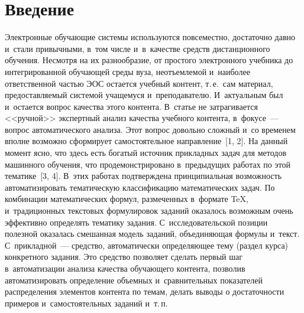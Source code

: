 
  
\vspace*{-6pt}



\thispagestyle{headings}

\begin{multicols}{2}

\label{st\stat}

\section{Введение}

\vspace*{-3pt}

     Электронные обучающие системы используются повсеместно, 
достаточно давно и~стали привычными, в~том числе и~в~качестве средств 
дистанционного обучения. Несмотря на их разнообразие, от простого 
электронного учебника до интегрированной обучающей среды вуза, 
неотъемлемой и~наиболее ответственной частью ЭОС остается учебный 
контент, т.\,е.\ сам материал, предоставляемый системой учащемуся и~преподавателю. И~актуальным был и~остается вопрос качества этого 
контента. В~статье не затрагивается <<ручной>> экспертный анализ качества 
учебного контента, в~фокусе~--- вопрос автоматического анализа. Этот 
вопрос довольно сложный и~со временем вполне возможно сформирует 
самостоятельное направление~[1, 2]. На данный момент ясно, что здесь есть 
богатый источник прикладных задач для методов машинного обучения, что 
продемонстрировано в~предыдущих работах по этой тематике~[3, 4]. В~этих 
работах подтверждена принципиальная возможность автоматизировать 
тематическую классификацию математических задач. По комбинации 
математических формул, размеченных в~формате \TeX, и~традиционных 
текстовых формулировок заданий оказалось возможным очень эффективно 
определять тематику задания. С~исследовательской позиции полезной 
оказалась смешанная модель заданий, объединяющая формулы и~текст. 
С~прикладной~--- средство, автоматически определяющее тему (раздел 
курса) конкретного задания. Это средство позволяет сделать первый шаг 
в~автоматизации анализа качества обучающего контента, позволив 
автоматизировать определение объемных и~сравнительных показателей 
распределения элементов контента по темам, делать выводы о достаточности 
примеров и~самостоятельных заданий и~т.\,п.



\end{multicols}
